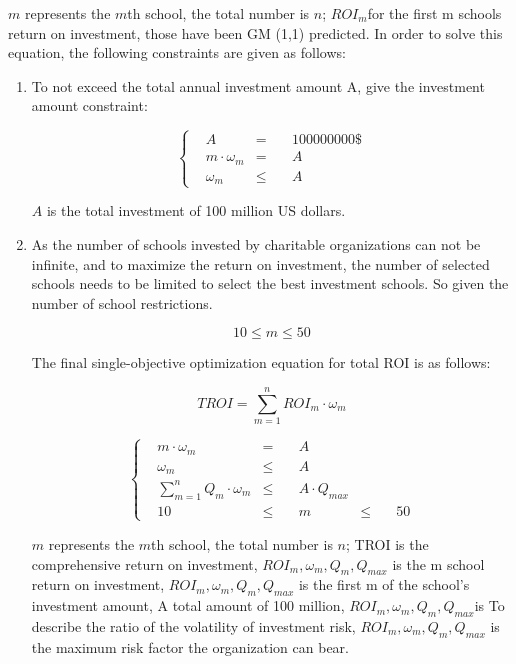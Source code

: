 \documentclass{mcmthesis}
\begin{document}
\par $m$ represents the $m$th school, the total number is $n$; $ROI_m$for the first m schools return on investment,  those have been GM (1,1) predicted. In order to solve this equation, the following constraints are given as follows:
\begin{enumerate}[(1)]
	\item To not exceed the total annual investment amount A, give the investment amount constraint:

\begin{equation}
	\label{eq22}
	\left\{
	\begin{split}
	&A & = \quad & 100000000\$ \\
	&m\cdot \omega_m & = \quad & A \\
	&\omega_m &\leqslant \quad & A
\end{split}
\right.
\end{equation}

\par $A$ is the total investment of 100 million US dollars.
	\item As the number of schools invested by charitable organizations can not be infinite, and to maximize the return on investment, the number of selected schools needs to be limited to select the best investment schools. So given the number of school restrictions.

\begin{equation}
	\label{eq29}
	10\leqslant m \leqslant 50
\end{equation}

\par The final single-objective optimization equation for total ROI is as follows:

\begin{equation}
	\label{eq30a}
	TROI = \sum\limits^{n}_{m=1}ROI_m\cdot\omega_m
\end{equation}
 
\begin{equation}
	\label{eq30b}
	\left\{
	\begin{split}
	& m \cdot\omega_m & = \quad &A\\
	&\omega_m & \leqslant \quad & A\\ 
	&\sum\limits^{n}_{m=1}Q_m\cdot\omega_m &\leqslant \quad &A\cdot Q_{max}\\
	&10 &\leqslant\quad & m &\leqslant\quad & 50
\end{split}
\right.
\end{equation}


                            
\par $m$ represents the $m$th school, the total number is $n$; TROI is the comprehensive return on investment, $ROI_m,\omega_m,Q_m,Q_{max}$ is the m school return on investment, $ROI_m,\omega_m,Q_m,Q_{max}$ is the first m of the school's investment amount, A total amount of 100 million, $ROI_m,\omega_m,Q_m,Q_{max}$is To describe the ratio of the volatility of investment risk, $ROI_m,\omega_m,Q_m,Q_{max}$ is the maximum risk factor the organization can bear.

\end{enumerate}
\end{document}
